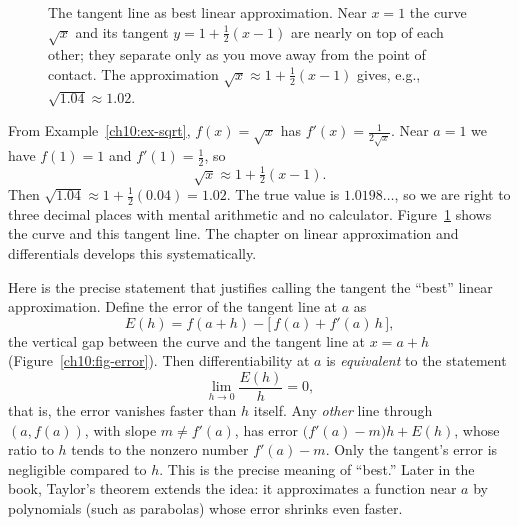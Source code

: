 \begin{figure}[htbp]
\centering
{}
\caption{The tangent line as best linear approximation. Near $x=1$ the curve
$\sqrt{x}$ and its tangent $y = 1 + \tfrac12(x-1)$ are nearly on top of each
other; they separate only as you move away from the point of contact. The
approximation $\sqrt{x} \approx 1 + \tfrac12(x-1)$ gives, e.g.,
$\sqrt{1.04} \approx 1.02$.}
\label{ch10:fig-linear}
\end{figure}

\begin{example}
\label{ch10:ex-approx}
From Example~\ref{ch10:ex-sqrt}, $f(x) = \sqrt{x}$ has $f'(x) = \tfrac{1}{2\sqrt
x}$. Near $a = 1$ we have $f(1) = 1$ and $f'(1) = \tfrac12$, so
\[
  \sqrt{x} \approx 1 + \tfrac12 (x - 1).
\]
Then $\sqrt{1.04} \approx 1 + \tfrac12(0.04) = 1.02$. The true value is
$1.0198\ldots$, so we are right to three decimal places with mental arithmetic and
no calculator. Figure~\ref{ch10:fig-linear} shows the curve and this tangent
line. The chapter on linear approximation and differentials develops this
systematically.
\end{example}

\begin{formalbox}
Here is the precise statement that justifies calling the tangent the ``best''
linear approximation. Define the error of the tangent line at $a$ as
\[
  E(h) = f(a + h) - \bigl[\, f(a) + f'(a)\,h \,\bigr],
\]
the vertical gap between the curve and the tangent line at $x = a + h$
(Figure~\ref{ch10:fig-error}).
Then differentiability at $a$ is \emph{equivalent} to the statement
\[
  \lim_{h \to 0} \frac{E(h)}{h} = 0,
\]
that is, the error vanishes faster than $h$ itself. Any \emph{other} line through
$(a,f(a))$, with slope $m \neq f'(a)$, has error $\bigl(f'(a) - m\bigr) h + E(h)$,
whose ratio to $h$ tends to the nonzero number $f'(a) - m$. Only the tangent's
error is negligible compared to $h$. This is the precise meaning of ``best.''
Later in the book, Taylor's theorem extends the idea: it approximates a function
near $a$ by polynomials (such as parabolas) whose error shrinks even faster.
\end{formalbox}

